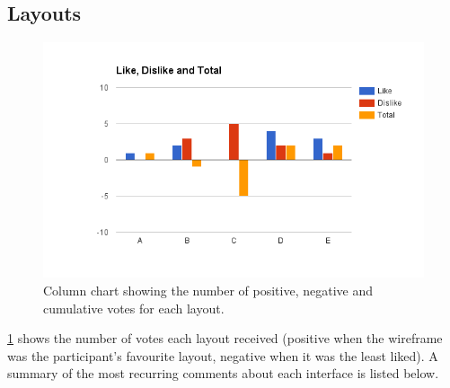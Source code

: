 \documentclass{mproj}
\begin{document}
\subsection{Layouts}

\begin{figure}[h]
	\centering
	\includegraphics[trim=0cm 0cm 0cm 2cm, width=\textwidth]{images/layout_feedback}
	\caption{Column chart showing the number of positive, negative and cumulative votes for each layout.}
	\label{fig:layout_feedback}
\end{figure}

\ref{fig:layout_feedback} shows the number of votes each layout received (positive when the wireframe was the participant's favourite layout, negative when it was the least liked). A summary of the most recurring comments about each interface is listed below.
\end{document}
